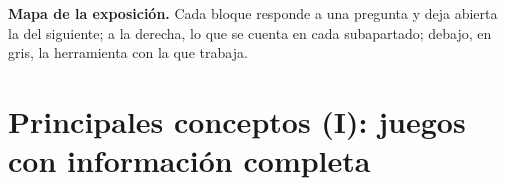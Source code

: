 \documentclass[11pt]{article}
\begin{document}
\begin{anotaciones}
\textbf{Mapa de la exposición.} Cada bloque responde a una pregunta y deja abierta la del siguiente; a la derecha, lo que se cuenta en cada subapartado; debajo, en gris, la herramienta con la que trabaja.
\begin{infografiacaja}
\caption{Mapa del tema: la pregunta de cada bloque, sus subapartados y el hilo que los une}\label{figu:mapa-tema}
\end{infografiacaja}
\end{anotaciones}



\section{Principales conceptos (I):\cortetitulo{} juegos con información completa}\label{sec:conceptos-informacion-completa}
\end{document}
